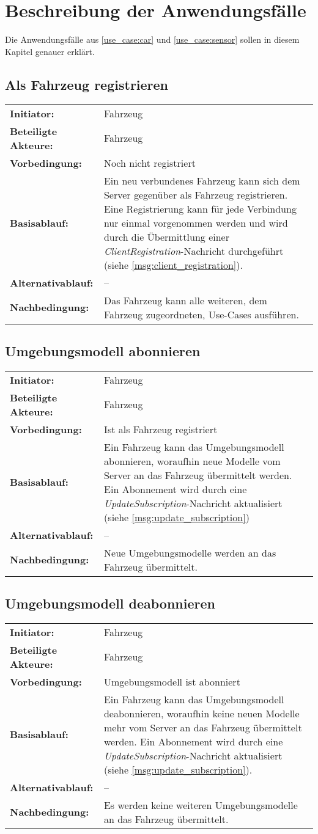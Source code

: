 \section{Beschreibung der Anwendungsfälle}

Die Anwendungsfälle aus \autoref{use_case:car} und \autoref{use_case:sensor} sollen in diesem Kapitel genauer erklärt.

\newcommand{\usecasetablewidth}{11.5cm}
\newcommand{\usecase}[7]{\subsection{#1}
	\begin{tabular}[H]{lp{\usecasetablewidth}}
		\textbf{Initiator:} & #2 \\
		\textbf{Beteiligte Akteure:} & #3 \\
		\textbf{Vorbedingung:} & #4 \\
		\textbf{Basisablauf:} & #5 \\
		\textbf{Alternativablauf:} & #6 \\
		\textbf{Nachbedingung:} & #7 \\
	\end{tabular}
}

\usecase{Als Fahrzeug registrieren}
	{Fahrzeug}
	{Fahrzeug}
	{Noch nicht registriert}
	{Ein neu verbundenes Fahrzeug kann sich dem Server gegenüber als Fahrzeug registrieren.
		Eine Registrierung kann für jede Verbindung  nur einmal vorgenommen werden und wird durch die Übermittlung einer \textit{ClientRegistration}-Nachricht durchgeführt (siehe \autoref{msg:client_registration}).}
	{--}
	{Das Fahrzeug kann alle weiteren, dem Fahrzeug zugeordneten, Use-Cases ausführen.}

\usecase{Umgebungsmodell abonnieren}
	{Fahrzeug}
	{Fahrzeug}
	{Ist als Fahrzeug registriert}
	{Ein Fahrzeug kann das Umgebungsmodell abonnieren, woraufhin neue Modelle vom Server an das Fahrzeug übermittelt werden.
		Ein Abonnement wird durch eine \textit{UpdateSubscription}-Nachricht aktualisiert (siehe \autoref{msg:update_subscription})}
	{--}
	{Neue Umgebungsmodelle werden an das Fahrzeug übermittelt.}
	
	
\usecase{Umgebungsmodell deabonnieren}
	{Fahrzeug}
	{Fahrzeug}
	{Umgebungsmodell ist abonniert}
	{Ein Fahrzeug kann das Umgebungsmodell deabonnieren, woraufhin keine neuen Modelle mehr vom Server an das Fahrzeug übermittelt werden.
		Ein Abonnement wird durch eine \textit{UpdateSubscription}-Nachricht aktualisiert (siehe \autoref{msg:update_subscription}).}
	{--}
	{Es werden keine weiteren Umgebungsmodelle an das Fahrzeug übermittelt.}

